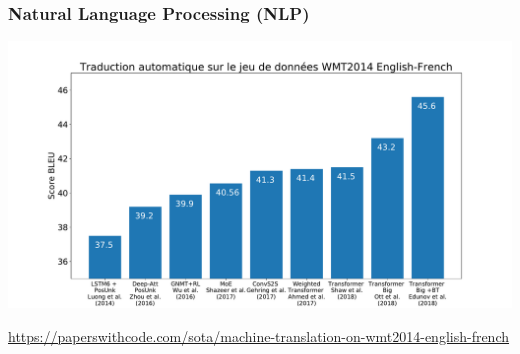 \documentclass[english,usenames,dvipsnames]{beamer}
\begin{document}
\begin{frame}
	\frametitle{Natural Language Processing (NLP)}
	\vspace{-5mm}
	\begin{center}
	\includegraphics[scale=0.30,trim={2.5cm 0 2.5cm 1.8cm},clip] {bleu}
	\end{center}
	\vspace{-5mm}
	{\tiny \url{https://paperswithcode.com/sota/machine-translation-on-wmt2014-english-french}}
\end{frame}
\end{document}
